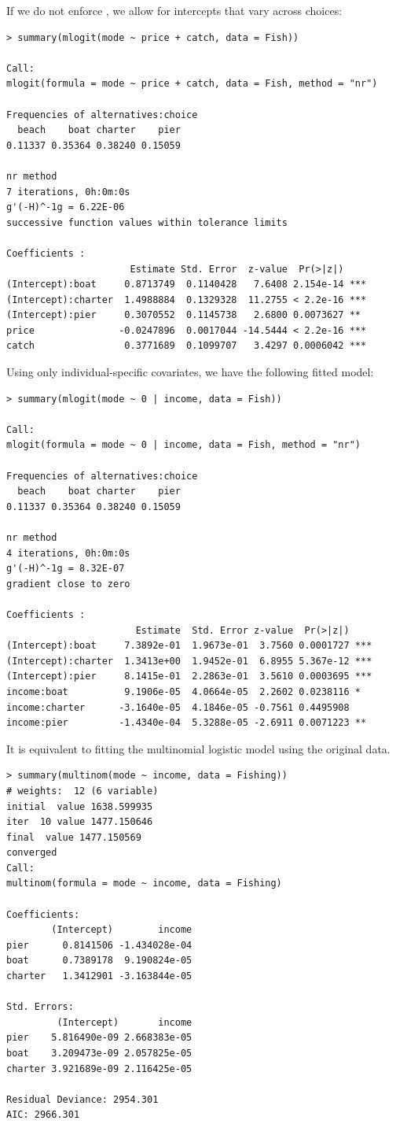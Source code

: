 If we do not enforce , we allow for intercepts that vary across choices:

\begin{lstlisting}
> summary(mlogit(mode ~ price + catch, data = Fish))

Call:
mlogit(formula = mode ~ price + catch, data = Fish, method = "nr")

Frequencies of alternatives:choice
  beach    boat charter    pier 
0.11337 0.35364 0.38240 0.15059 

nr method
7 iterations, 0h:0m:0s 
g'(-H)^-1g = 6.22E-06 
successive function values within tolerance limits 

Coefficients :
                      Estimate Std. Error  z-value  Pr(>|z|)    
(Intercept):boat     0.8713749  0.1140428   7.6408 2.154e-14 ***
(Intercept):charter  1.4988884  0.1329328  11.2755 < 2.2e-16 ***
(Intercept):pier     0.3070552  0.1145738   2.6800 0.0073627 ** 
price               -0.0247896  0.0017044 -14.5444 < 2.2e-16 ***
catch                0.3771689  0.1099707   3.4297 0.0006042 ***
\end{lstlisting}

Using only individual-specific covariates, we have the following fitted model:

\begin{lstlisting}
> summary(mlogit(mode ~ 0 | income, data = Fish))

Call:
mlogit(formula = mode ~ 0 | income, data = Fish, method = "nr")

Frequencies of alternatives:choice
  beach    boat charter    pier 
0.11337 0.35364 0.38240 0.15059 

nr method
4 iterations, 0h:0m:0s 
g'(-H)^-1g = 8.32E-07 
gradient close to zero 

Coefficients :
                       Estimate  Std. Error z-value  Pr(>|z|)    
(Intercept):boat     7.3892e-01  1.9673e-01  3.7560 0.0001727 ***
(Intercept):charter  1.3413e+00  1.9452e-01  6.8955 5.367e-12 ***
(Intercept):pier     8.1415e-01  2.2863e-01  3.5610 0.0003695 ***
income:boat          9.1906e-05  4.0664e-05  2.2602 0.0238116 *  
income:charter      -3.1640e-05  4.1846e-05 -0.7561 0.4495908    
income:pier         -1.4340e-04  5.3288e-05 -2.6911 0.0071223 ** 
\end{lstlisting}

It is equivalent to fitting the multinomial logistic model using the original data. 

\begin{lstlisting}
> summary(multinom(mode ~ income, data = Fishing))
# weights:  12 (6 variable)
initial  value 1638.599935 
iter  10 value 1477.150646
final  value 1477.150569 
converged
Call:
multinom(formula = mode ~ income, data = Fishing)

Coefficients:
        (Intercept)        income
pier      0.8141506 -1.434028e-04
boat      0.7389178  9.190824e-05
charter   1.3412901 -3.163844e-05

Std. Errors:
         (Intercept)       income
pier    5.816490e-09 2.668383e-05
boat    3.209473e-09 2.057825e-05
charter 3.921689e-09 2.116425e-05

Residual Deviance: 2954.301 
AIC: 2966.301 
\end{lstlisting}

